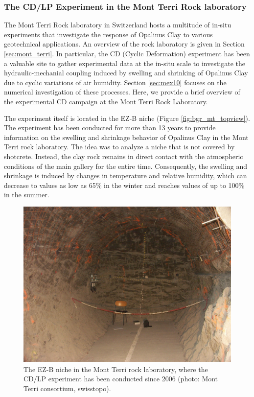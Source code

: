 \subsubsection{The CD/LP Experiment in the Mont Terri Rock laboratory}

The Mont Terri Rock laboratory in Switzerland hosts a multitude of in-situ experiments that investigate the response of Opalinus Clay to various geotechnical applications. An overview of the rock laboratory is given in Section \ref{sec:mont_terri}. In particular, the CD (Cyclic Deformation) experiment has been a valuable site to gather experimental data at the in-situ scale to investigate the hydraulic-mechanial coupling induced by swelling and shrinking of Opalinus Clay due to cyclic variations of air humidity. Section \ref{sec:mex10} focuses on the numerical investigation of these processes. Here, we provide a brief overview of the experimental CD campaign at the Mont Terri Rock Laboratory. 

The experiment itself is located in the EZ-B niche (Figure \ref{fig:bgr_mt_topview}). The experiment has been conducted for more than 13 years to provide information on the swelling and shrinkage behavior of Opalinus Clay in the Mont Terri rock laboratory. The idea was to analyze a niche that is not covered by shotcrete. Instead, the clay rock remains in direct contact with the atmospheric conditions of the main gallery for the entire time. Consequently, the swelling and shrinkage is induced by changes in temperature and relative humidity, which can decrease to values as low as 65\% in the winter and reaches values of up to 100\% in the summer. 

\begin{figure}[!ht]
\centering
\includegraphics[width=1\textwidth]{./figures/bgr_CD_experiment.jpg}
\caption{The EZ-B niche in the Mont Terri rock laboratory, where the CD/LP experiment has been conducted since 2006 (photo: Mont Terri consortium, swisstopo).}
\label{fig:bgr_CD_experiment}
\end{figure}

